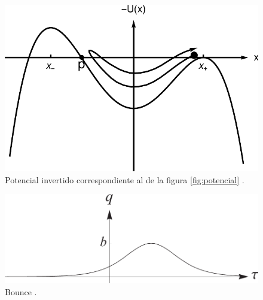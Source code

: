 \begin{figure}[h]
	\centering
	\includegraphics[scale = 0.3]{FIGURAS/potencial_invertido}
	\caption{Potencial invertido  correspondiente al de la figura \ref{fig:potencial} \cite{Ai:2019dqr}.}
	\label{fig:potencial_invertido}
\end{figure}



\begin{figure}[t]
	\centering
	\includegraphics[scale=0.25]{FIGURAS/bounce}
	\caption{Bounce \cite{weinberg2012classical}. %
	}
	\label{fig:bounce}
\end{figure}

